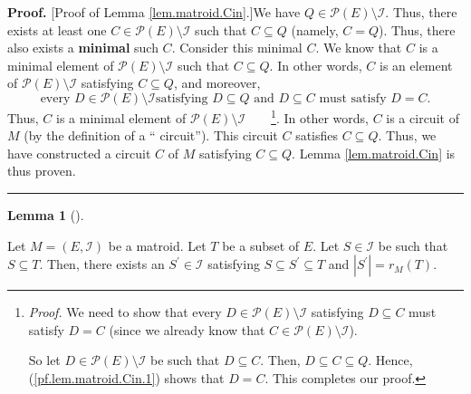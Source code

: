 \documentclass[numbers=enddot,12pt,final,onecolumn,notitlepage]{scrartcl}%
\theoremstyle{definition}
\newtheorem{lem}[theo]{Lemma}
\newenvironment{lemma}[1][]
{\begin{lem}[#1]\begin{leftbar}}
{\end{leftbar}\end{lem}}
\newenvironment{proof}[1][Proof]{\noindent\textbf{#1.} }{\ \rule{0.5em}{0.5em}}
\begin{document}
\begin{proof}
[Proof of Lemma \ref{lem.matroid.Cin}.]We have $Q\in\mathcal{P}\left(
E\right)  \setminus\mathcal{I}$. Thus, there exists at least one
$C\in\mathcal{P}\left(  E\right)  \setminus\mathcal{I}$ such that $C\subseteq
Q$ (namely, $C=Q$). Thus, there also exists a \textbf{minimal} such $C$.
Consider this minimal $C$. We know that $C$ is a minimal element of
$\mathcal{P}\left(  E\right)  \setminus\mathcal{I}$ such that $C\subseteq Q$.
In other words, $C$ is an element of $\mathcal{P}\left(  E\right)
\setminus\mathcal{I}$ satisfying $C\subseteq Q$, and moreover,%
\begin{equation}
\text{every }D\in\mathcal{P}\left(  E\right)  \setminus\mathcal{I}\text{
satisfying }D\subseteq Q\text{ and }D\subseteq C\text{ must satisfy }D=C.
\label{pf.lem.matroid.Cin.1}%
\end{equation}
Thus, $C$ is a minimal element of $\mathcal{P}\left(  E\right)  \setminus
\mathcal{I}$\ \ \ \ \footnote{\textit{Proof.} We need to show that every
$D\in\mathcal{P}\left(  E\right)  \setminus\mathcal{I}$ satisfying $D\subseteq
C$ must satisfy $D=C$ (since we already know that $C\in\mathcal{P}\left(
E\right)  \setminus\mathcal{I}$).
\par
So let $D\in\mathcal{P}\left(  E\right)  \setminus\mathcal{I}$ be such that
$D\subseteq C$. Then, $D\subseteq C\subseteq Q$. Hence,
(\ref{pf.lem.matroid.Cin.1}) shows that $D=C$. This completes our proof.}. In
other words, $C$ is a circuit of $M$ (by the definition of a \textquotedblleft
circuit\textquotedblright). This circuit $C$ satisfies $C\subseteq Q$. Thus,
we have constructed a circuit $C$ of $M$ satisfying $C\subseteq Q$. Lemma
\ref{lem.matroid.Cin} is thus proven.
\end{proof}

\begin{lemma}
\label{lem.matroid.basext}Let $M=\left(  E,\mathcal{I}\right)  $ be a matroid.
Let $T$ be a subset of $E$. Let $S\in\mathcal{I}$ be such that $S\subseteq T$.
Then, there exists an $S^{\prime}\in\mathcal{I}$ satisfying $S\subseteq
S^{\prime}\subseteq T$ and $\left\vert S^{\prime}\right\vert =r_{M}\left(
T\right)  $.
\end{lemma}
\end{document}
